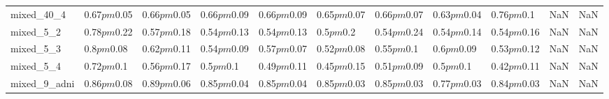 \begin{tabular}{lllllllllll}
mixed_40_4 & 0.67$pm$0.05 & 0.66$pm$0.05 & 0.66$pm$0.09 & 0.66$pm$0.09 & 0.65$pm$0.07 & 0.66$pm$0.07 & 0.63$pm$0.04 & 0.76$pm$0.1 & NaN & NaN \\
mixed_5_2 & 0.78$pm$0.22 & 0.57$pm$0.18 & 0.54$pm$0.13 & 0.54$pm$0.13 & 0.5$pm$0.2 & 0.54$pm$0.24 & 0.54$pm$0.14 & 0.54$pm$0.16 & NaN & NaN \\
mixed_5_3 & 0.8$pm$0.08 & 0.62$pm$0.11 & 0.54$pm$0.09 & 0.57$pm$0.07 & 0.52$pm$0.08 & 0.55$pm$0.1 & 0.6$pm$0.09 & 0.53$pm$0.12 & NaN & NaN \\
mixed_5_4 & 0.72$pm$0.1 & 0.56$pm$0.17 & 0.5$pm$0.1 & 0.49$pm$0.11 & 0.45$pm$0.15 & 0.51$pm$0.09 & 0.5$pm$0.1 & 0.42$pm$0.11 & NaN & NaN \\
mixed_9_adni & 0.86$pm$0.08 & 0.89$pm$0.06 & 0.85$pm$0.04 & 0.85$pm$0.04 & 0.85$pm$0.03 & 0.85$pm$0.03 & 0.77$pm$0.03 & 0.84$pm$0.03 & NaN & NaN \\
\bottomrule
\end{tabular}
